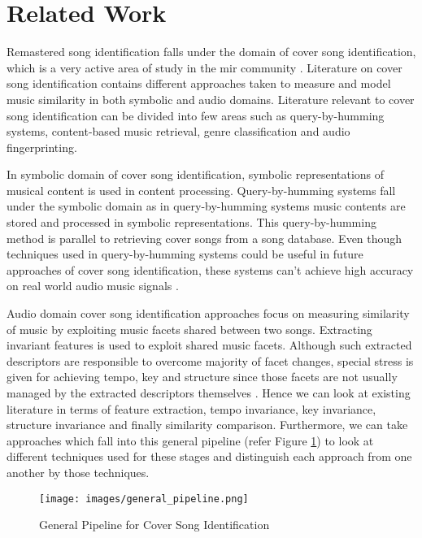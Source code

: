 \section{Related Work}

Remastered song identification falls under the domain of cover song identification,
which is a very active area of study in the \gls{mir} community \cite{Serra2010}.
Literature on cover song identification contains different approaches taken to
measure and model music similarity in both symbolic and audio domains. Literature
relevant to cover song identification can be divided into few areas such as
query-by-humming systems, content-based music retrieval, genre classification
and audio fingerprinting.

In symbolic domain of cover song identification, symbolic representations of
musical content is used in content processing. Query-by-humming systems
\cite{query_by_humming} fall under the symbolic domain as in query-by-humming
systems music contents are stored and processed in symbolic representations.
This query-by-humming method is parallel to retrieving cover songs from a song
database. Even though techniques used in query-by-humming systems could be useful
in future approaches of cover song identification, these systems can't achieve
high accuracy on real world audio music signals \cite{comparative_query_by_humming,Serra2010}.


Audio domain cover song identification approaches focus on measuring similarity
of music by exploiting music facets shared between two songs. Extracting invariant
features is used to exploit shared music facets. Although such extracted descriptors
are responsible to overcome majority of facet changes, special stress is given for
achieving tempo, key and structure since those facets are not usually managed by
the extracted descriptors themselves \cite{Serra2010}. Hence we can look at existing
literature in terms of feature extraction, tempo invariance, key invariance, structure
invariance and finally similarity comparison. Furthermore, we can take approaches which fall
into this general pipeline (refer Figure \ref{fig:general_pipeline}) to look at different techniques used for these stages and
distinguish each approach from one another by those techniques.

\begin{figure}[h]
    \centering
    \texttt{[image: images/general\_pipeline.png]}
    \caption{General Pipeline for Cover Song Identification}
    \label{fig:general_pipeline}
\end{figure}

